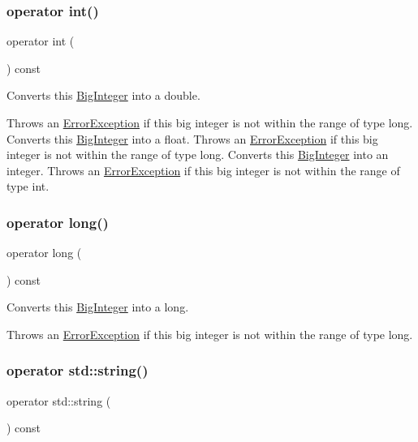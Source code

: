 \subsubsection{\texorpdfstring{operator int()}{operator int()}}
{\footnotesize\ttfamily operator int (\begin{DoxyParamCaption}{ }\end{DoxyParamCaption}) const\hspace{0.3cm}{\ttfamily [explicit]}}



Converts this \mbox{\hyperlink{classBigInteger}{Big\+Integer}} into a double. 

Throws an \mbox{\hyperlink{classErrorException}{Error\+Exception}} if this big integer is not within the range of type long. Converts this \mbox{\hyperlink{classBigInteger}{Big\+Integer}} into a float. Throws an \mbox{\hyperlink{classErrorException}{Error\+Exception}} if this big integer is not within the range of type long. Converts this \mbox{\hyperlink{classBigInteger}{Big\+Integer}} into an integer. Throws an \mbox{\hyperlink{classErrorException}{Error\+Exception}} if this big integer is not within the range of type int. \mbox{\label{classBigInteger_ad7ce59321a0dd63e7f1fab6dceabe53b}} 
\subsubsection{\texorpdfstring{operator long()}{operator long()}}
{\footnotesize\ttfamily operator long (\begin{DoxyParamCaption}{ }\end{DoxyParamCaption}) const\hspace{0.3cm}{\ttfamily [explicit]}}



Converts this \mbox{\hyperlink{classBigInteger}{Big\+Integer}} into a long. 

Throws an \mbox{\hyperlink{classErrorException}{Error\+Exception}} if this big integer is not within the range of type long. \mbox{\label{classBigInteger_a3888dcd59dd5acd1ca5b9bee4c2e252a}} 
\subsubsection{\texorpdfstring{operator std\+::string()}{operator std::string()}}
{\footnotesize\ttfamily operator std\+::string (\begin{DoxyParamCaption}{ }\end{DoxyParamCaption}) const\hspace{0.3cm}{\ttfamily [explicit]}}



